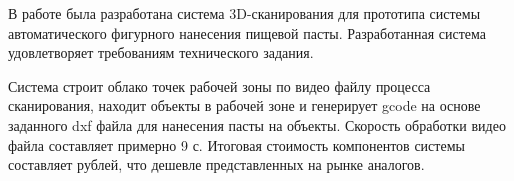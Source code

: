 \conclusion
В работе была разработана система 3D-сканирования для прототипа системы автоматического фигурного нанесения пищевой пасты. Разработанная система удовлетворяет требованиям технического задания.

Система строит облако точек рабочей зоны по видео файлу процесса сканирования, находит объекты в рабочей зоне и генерирует gcode на основе заданного dxf файла для нанесения пасты на объекты. Скорость обработки видео файла составляет примерно 9 с. Итоговая стоимость компонентов системы составляет  рублей, что дешевле представленных на рынке аналогов.

